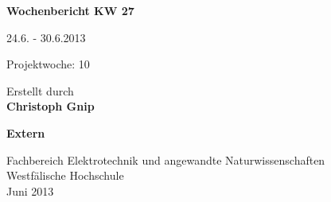 
\begin{center}
{\Huge \textbf{Wochenbericht KW 27}\par}
\vspace{1cm}
{\Huge 24.6. - 30.6.2013\par}
\vspace{1cm}
{\Huge Projektwoche: 10\par}

\vspace{2cm}

\large{Erstellt durch}\\
\Large{\textbf{Christoph Gnip}}


\vspace{4cm}

\Large{\textbf{Extern}}

\vfill

{\normalsize Fachbereich Elektrotechnik und angewandte Naturwissenschaften\\
Westfälische Hochschule\\[2ex]Juni 2013}


\end{center}
\newpage